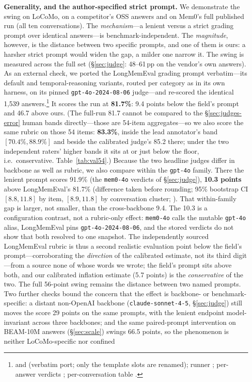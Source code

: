 \documentclass[11pt]{article}
\begin{document}
\textbf{Generality, and the author-specified strict prompt.} We demonstrate the swing on LoCoMo, on a competitor's OSS answers and on Mem0's full published run (all ten conversations). The \emph{mechanism}---a lenient versus a strict grading prompt over identical answers---is benchmark-independent. The \emph{magnitude}, however, is the distance between two specific prompts, and one of them is ours: a harsher strict prompt would widen the gap, a milder one narrow it. The swing is measured across the full set (\S\ref{sec:judge}: 48--61\,pp on the vendor's own answers). As an external check, we ported the LongMemEval grading prompt \citep{longmemeval} verbatim---its default and temporal-reasoning variants, routed per category as in its own harness, on its pinned \texttt{gpt-4o-2024-08-06} judge---and re-scored the identical 1{,}539 answers.\footnote{ and  (verbatim port; only the template slots are renamed); runner ; per-answer verdicts ; per-conversation table .} It scores the run at \textbf{81.7\%}: 9.4 points below the field's prompt and 46.7 above ours. (The full-run 81.7 cannot be compared to the \S\ref{sec:judges-error} human bands directly---those are 54-item aggregates---so we also score the same rubric on those 54 items: \textbf{83.3\%}, inside the lead annotator's band $[70.4\%, 88.9\%]$ and beside the calibrated judge's 85.2 there; under the two independent raters' higher bands it sits at or just below the floor, i.e.\ conservative. Table~\ref{tab:val54}.) Because the two headline judges differ in backbone as well as rubric, we also compare within the \texttt{gpt-4o} family. There the lenient prompt scores 91.9\% (the \texttt{mem0-4o} verdicts of \S\ref{sec:judge}), \textbf{10.3 points} above LongMemEval's 81.7\% (difference taken before rounding; 95\% bootstrap CI $[8.8, 11.8]$ by item, $[8.9, 11.8]$ by conversation cluster; ). That within-family gap is larger, not smaller, than the cross-backbone 9.4. The 10.3 is a configuration contrast, not a rubric-only effect: \texttt{mem0-4o} calls the mutable \texttt{gpt-4o} alias, LongMemEval pins \texttt{gpt-4o-2024-08-06}, and the stored verdicts do not show that both resolved to one snapshot. The independently sourced LongMemEval rubric is thus a second realistic evaluation point below the field's prompt---corroborating the \emph{direction} of the calibrated estimate, not its third digit---from a source none of whose words we wrote; the field's prompt sits above both, and our calibrated inflation estimate (5.7 points) is the \emph{conservative} of the two. The full 56-point swing remains the distance between two named prompts. Two further checks bound the concern that the effect is backbone- or benchmark-specific: a distant non-OpenAI backbone (\texttt{claude-sonnet-4-5}, \S\ref{sec:judge}) still moves the score 29 points on the same prompts, with the lenient endpoint model-invariant across three backbones; and the same paired-prompt intervention on BEAM-10M answers (\S\ref{sec:scale}) swings 66.5 points, so the phenomenon is neither LoCoMo-specific nor confined 
\end{document}
